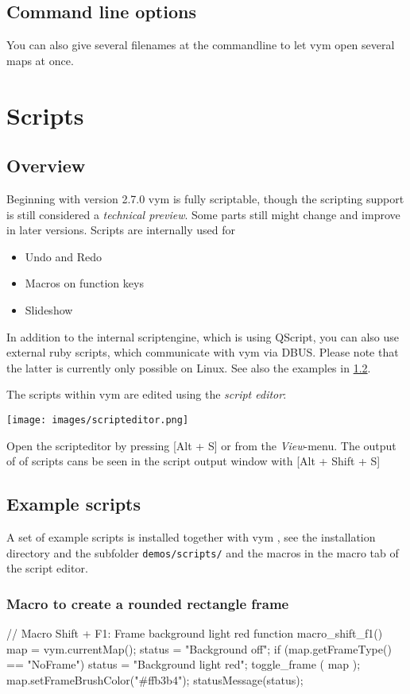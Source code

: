 \documentclass[12pt,a4paper]{article}
\newcommand{\vym}{{\sc vym }}
\newcommand{\key}[1]{[#1]}
\newenvironment{code}[1] { \verbatim #1}{\endverbatim  }
\begin{document}
\begin{appendix}
\subsection{Command line options} \label{options} 

You can also give several filenames at the commandline to let \vym open
several maps at once.
 

\section{Scripts} \label{scripts}   
\subsection{Overview}
Beginning with version 2.7.0 \vym is fully scriptable, though the
scripting support is still considered a {\em technical preview}. Some
parts still might change and improve in later versions.
Scripts are internally used for
\begin{itemize}
    \item Undo and Redo
    \item Macros on function keys
    \item Slideshow
\end{itemize}
In addition to the internal scriptengine, which is using QScript, 
you can also  use external ruby scripts, which communicate with \vym via
DBUS. Please note that the latter is currently only possible on Linux.
See also the examples in \ref{examplescripts}.

The scripts within \vym are edited using the {\em script editor}:
\begin{center} \label{scripteditor}
    \texttt{[image: images/scripteditor.png]}
\end{center}
Open the scripteditor by pressing \key{Alt + S} or from the {\em
View}-menu. The output of of scripts cans be seen in the script output
window with \key{Alt + Shift + S}

\subsection{Example scripts}  \label{examplescripts}
A set of example scripts is installed together with \vym, see the
installation directory and the subfolder {\tt demos/scripts/} and the
macros in the macro tab of the script editor.
\subsubsection{Macro to create a rounded rectangle frame}
\begin{code}
// Macro Shift + F1: Frame background light red
function macro_shift_f1()
{
    map = vym.currentMap();
    status = "Background off";
    if (map.getFrameType() == "NoFrame") {
        status = "Background light red";
    }
    toggle_frame ( map );
    map.setFrameBrushColor("#ffb3b4");
    statusMessage(status);
}
\end{code}


\end{appendix}
\end{document}
